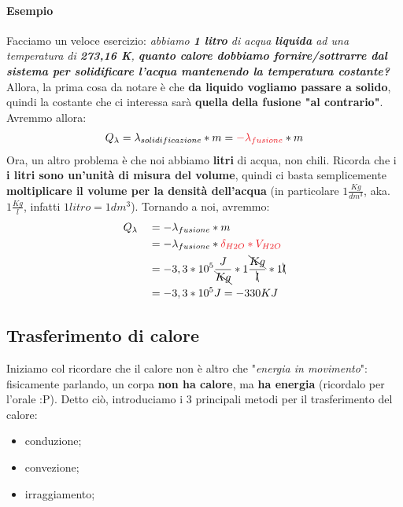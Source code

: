             \paragraph{Esempio}
                Facciamo un veloce esercizio: \textit{abbiamo \textbf{1 litro} di acqua \textbf{liquida} ad una temperatura di \textbf{273,16 K}, \textbf{quanto calore dobbiamo fornire/sottrarre dal sistema per solidificare l'acqua mantenendo la temperatura costante?}} \\
                Allora, la prima cosa da notare è che \textbf{da liquido vogliamo passare a solido}, quindi la costante che ci interessa sarà \textbf{quella della fusione "al contrario"}. Avremmo allora:
                \begin{align*}
                    Q_\lambda = \lambda_{solidificazione}*m=\textcolor{Red}{-\lambda_{fusione}}*m
                \end{align*}
                Ora, un altro problema è che noi abbiamo \textbf{litri} di acqua, non chili. Ricorda che i \textbf{i litri sono un'unità di misura del volume}, quindi ci basta semplicemente \textbf{moltiplicare il volume per la densità dell'acqua} (in particolare $1\frac{Kg}{dm^3}$, aka. $1\frac{Kg}{l}$, infatti $1 litro = 1 dm^3$). Tornando a noi, avremmo:
                \begin{align*}
                    &Q_\lambda &&= -\lambda_{fusione}*m\\
                    & &&= -\lambda_{fusione}*\textcolor{Red}{\delta_{H2O}*V_{H2O}}\\
                    & &&= -3,3 *10^5\frac{J}{\bcancel{Kg}}*1\frac{\bcancel{Kg}}{\bcancel{l}}*1\bcancel{l}\\
                    & &&= -3,3 *10^5J = -330 KJ
                \end{align*}

    \subsection{Trasferimento di calore}
        Iniziamo col ricordare che il calore non è altro che "\textit{energia in movimento}": fisicamente parlando, un corpa \textbf{non ha calore}, ma \textbf{ha energia} (ricordalo per l'orale :P). Detto ciò, introduciamo i 3 principali metodi per il trasferimento del calore:
        \begin{itemize}
            \item conduzione;
            \item convezione;
            \item irraggiamento;
        \end{itemize}

